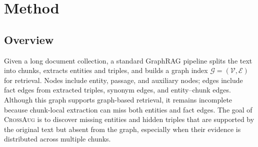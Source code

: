 \documentclass[11pt]{article}
\newcommand{\ours}{\textsc{CrossAug}\xspace}
\begin{document}

\section{Method}

\subsection{Overview}

{Given a long document collection, a standard GraphRAG pipeline splits the text into chunks, extracts entities and triples, and builds a graph index $\mathcal{G}=(\mathcal{V},\mathcal{E})$ for retrieval. Nodes include entity, passage, and auxiliary nodes; edges include fact edges from extracted triples, synonym edges, and entity--chunk edges. Although this graph supports graph-based retrieval, it remains incomplete because chunk-local extraction can miss both entities and fact edges. The goal of \ours is to discover missing entities and hidden triples that are supported by the original text but absent from the graph, especially when their evidence is distributed across multiple chunks.}
\end{document}
